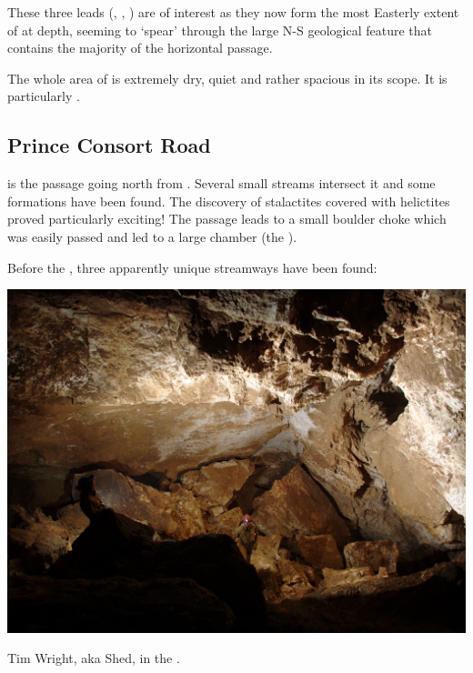 These three leads (, , ) are of
interest as they now form the most Easterly extent of 
at depth, seeming to `spear' through the large N-S geological feature
that contains the majority of the horizontal passage.

The whole area of  is extremely dry, quiet and rather
spacious in its scope. It is particularly .


\subsection{Prince Consort Road}

 is the passage going north from
. Several small streams intersect it and some formations
have been found. The discovery of stalactites covered with helictites
proved particularly exciting! The passage leads to a small boulder choke
which was easily passed and led to a large chamber (the ).

Before the , three apparently unique streamways have been found:


\begin{pagefigure}
\checkoddpage \ifoddpage \forcerectofloat \else \forceversofloat \fi
   \centering
\includegraphics[width = \textwidth]{2010/expo_findings/20100731-21-53-00-Jarvist Frost-Canon G5-CRW_0402-Albert Hall - Prince Consort Road--orig.jpg}
\caption{Tim Wright, aka Shed, in the \protect{}. } \label{Albert Hall}
\end{pagefigure}


